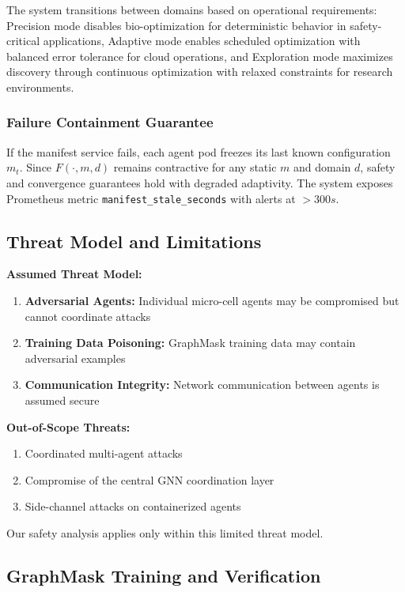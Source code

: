 \documentclass{article}
\begin{document}
The system transitions between domains based on operational requirements: Precision mode disables bio-optimization for deterministic behavior in safety-critical applications, Adaptive mode enables scheduled optimization with balanced error tolerance for cloud operations, and Exploration mode maximizes discovery through continuous optimization with relaxed constraints for research environments.

\subsubsection{Failure Containment Guarantee}

If the manifest service fails, each agent pod freezes its last known configuration $m_t$. Since $F(\cdot, m, d)$ remains contractive for any static $m$ and domain $d$, safety and convergence guarantees hold with degraded adaptivity. The system exposes Prometheus metric \texttt{manifest\_stale\_seconds} with alerts at $> 300s$.

\subsection{Threat Model and Limitations}

\textbf{Assumed Threat Model:}
\begin{enumerate}
\item \textbf{Adversarial Agents:} Individual micro-cell agents may be compromised but cannot coordinate attacks
\item \textbf{Training Data Poisoning:} GraphMask training data may contain adversarial examples
\item \textbf{Communication Integrity:} Network communication between agents is assumed secure
\end{enumerate}

\textbf{Out-of-Scope Threats:}
\begin{enumerate}
\item Coordinated multi-agent attacks
\item Compromise of the central GNN coordination layer
\item Side-channel attacks on containerized agents
\end{enumerate}

Our safety analysis applies only within this limited threat model.

\subsection{GraphMask Training and Verification}
\end{document}
